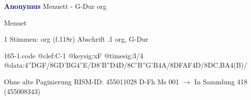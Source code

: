\documentclass[twocolumn]{book}
\begin{document}
\newline \par \vspace{7pt} \textcolor{darkblue}{\textbf{Anonymus  }}
\newline Menuett - G-Dur
\newline org
\newline \begin{itshape}[f.118r, heading:] Menuet\end{itshape} 
\newline \textcolor{darkblue}{}  1 Stimmen: org  (f.118r)
\newline Abschrift
.1  org, G-Dur  
\begin{filecontents*}{165-1.code}
@clef:C-1
@keysig:xF
@timesig:3/4
@data:4''DGF/{8GD'BG}4''E/D{8'B''D}4D/{8C'B''G'B}4A/{8DF}{AF}4D/{8DC,BA}4(B)/
\end{filecontents*}
\newline
%
\newline Ohne alte Paginierung
\newline RISM-ID: 455011028
\newline D-Fh  Ms 001
\newline $\rightarrow$ In Sammlung 418 (455008343)
      
\end{document}
